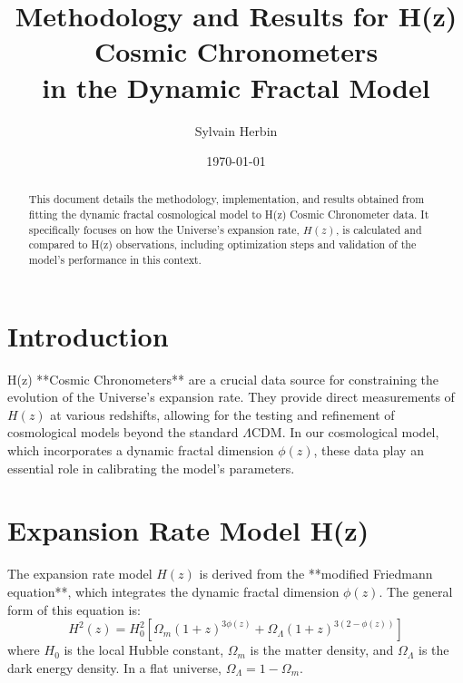 \documentclass{article}
\title{Methodology and Results for H(z) Cosmic Chronometers \\ in the Dynamic Fractal Model}
\author{Sylvain Herbin\orcidlink{0009-0001-3390-5012}}
\date{\today}
\begin{document}
\maketitle

\begin{abstract}
This document details the methodology, implementation, and results obtained from fitting the dynamic fractal cosmological model to H(z) Cosmic Chronometer data. It specifically focuses on how the Universe's expansion rate, $H(z)$, is calculated and compared to H(z) observations, including optimization steps and validation of the model's performance in this context.
\end{abstract}

\tableofcontents
\newpage

\section{Introduction}
H(z) **Cosmic Chronometers** are a crucial data source for constraining the evolution of the Universe's expansion rate. They provide direct measurements of $H(z)$ at various redshifts, allowing for the testing and refinement of cosmological models beyond the standard $\Lambda$CDM. In our cosmological model, which incorporates a dynamic fractal dimension $\phi(z)$, these data play an essential role in calibrating the model's parameters.

\section{Expansion Rate Model H(z)}

The expansion rate model $H(z)$ is derived from the **modified Friedmann equation**, which integrates the dynamic fractal dimension $\phi(z)$. The general form of this equation is:
$$H^2(z) = H_0^2 \left[ \Omega_m (1+z)^{3\phi(z)} + \Omega_\Lambda (1+z)^{3(2-\phi(z))} \right]$$
where $H_0$ is the local Hubble constant, $\Omega_m$ is the matter density, and $\Omega_\Lambda$ is the dark energy density. In a flat universe, $\Omega_\Lambda = 1 - \Omega_m$.
\end{document}
